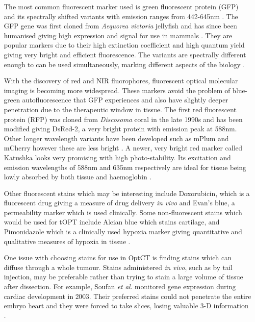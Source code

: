 The most common fluorescent marker used is  green fluorescent protein (GFP) and its spectrally shifted variants with emission ranges from 442-645nm \cite{Hoffman:2005}. The GFP gene was first cloned from \textit{Aequorea victoria} jellyfish and has since been humanised giving high expression and signal for use in mammals \cite{Hoffman:2009}. They are popular markers due to their high extinction coefficient and high quantum yield giving very bright and efficient fluorescence. The variants are spectrally different enough to can be used simultaneously, marking different aspects of the biology \cite{Hoffman:2005}. 

With the discovery of red and NIR fluorophores, fluorescent optical molecular imaging is becoming  more widespread. These markers avoid the problem of blue-green autofluorescence that GFP experiences and also have slightly deeper penetration due to the therapeutic window in tissue. The first red fluorescent protein (RFP) was cloned from \textit{Discosoma} coral in the late 1990s and has been modified giving DsRed-2, a very bright protein with emission peak at 588nm. Other longer wavelength variants have been developed such as mPlum and mCherry however these are less bright \cite{Hoffman:2009}. A newer, very bright red marker called Katushka looks very promising with high photo-stability. Its excitation and emission wavelengths of 588nm and 635nm respectively are ideal for tissue being lowly absorbed by both tissue and haemoglobin \cite{Shcherbo:2007}.
 

Other fluorescent stains which may be interesting include  Doxorubicin, which is a fluorescent drug  giving a measure of drug delivery \textit{in vivo} and Evan's blue, a permeability marker which is used clinically. 
Some non-fluorescent stains which would be used for tOPT include Alcian blue which stains cartilage, and Pimonidazole which is a clinically used hypoxia marker giving quantitative and qualitative measures of hypoxia in tissue \cite{Varia:1998}. 



One issue with choosing stains for use in OptCT is finding stains which can diffuse through a whole tumour. Stains administered \textit{in vivo}, such as by tail injection, may be preferable rather than trying to stain a large volume of tissue after dissection. For example, Soufan \textit{et al.} monitored gene expression during cardiac development in 2003. Their preferred stains  could not penetrate the entire embryo heart and they were forced to take slices, losing valuable 3-D information \cite{Soufan:2003cd}. 


